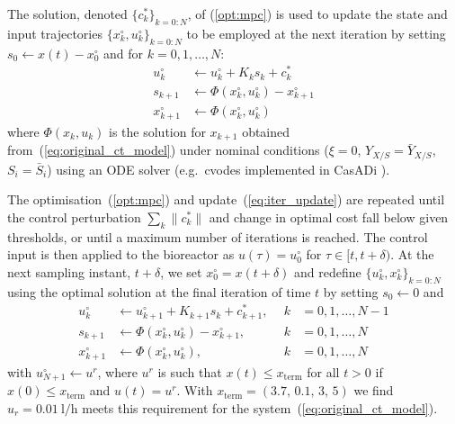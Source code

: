 \documentclass[final,5p,times,twocolumn,authoryear]{elsarticle}
\begin{document}
The solution, denoted $\{c^\ast_k\}_{k=0:N}$, of (\ref{opt:mpc}) is used to update the state and input trajectories $\{x^\circ_k,u^\circ_k\}_{k=0:N}$ to be employed at the next iteration by setting $s_0 \gets x(t) - x_0^\circ$ and for $k=0,1,\ldots,N$:%
\begin{subequations}\label{eq:iter_update}%
\begin{align}
u_k^\circ &\gets u_k^\circ+ K_k s_k  + c_k^\ast 
\\
s_{k+1} & \gets \Phi (x_k^\circ, u_k^\circ) - x_{k+1}^\circ
\\
x_{k+1}^\circ &\gets \Phi (x_k^\circ, u_k^\circ)
\end{align}
\end{subequations}
where $\Phi(x_k,u_k)$ is the solution for $x_{k+1}$ obtained from~(\ref{eq:original_ct_model})  under nominal conditions ($\xi=0$, $Y_{X/S} = \bar{Y}_{X/S}$, $S_i = \bar{S}_i$) using an ODE solver (e.g.~cvodes \citep{hindmarsh05:cvodes} implemented in CasADi \citep{andersson19:casadi}).

The optimisation~(\ref{opt:mpc}) and update~(\ref{eq:iter_update}) are repeated until the control perturbation $\sum_k \|c^\ast_k\|$
and change in optimal cost
fall below given thresholds, or until a maximum number of iterations is reached. The control input is then applied to the bioreactor as
$u(\tau) =u_0^\circ$ for $\tau\in[t,t+\delta)$.
At the next sampling instant, $t+\delta$, we set $x_0^\circ = x(t+\delta)$ and redefine $\{u^\circ_k , x^\circ_k\}_{k=0:N}$ using the optimal solution at the final iteration of time $t$ by setting $s_0 \gets 0$ and%
\begin{subequations}\label{eq:sample_update}%
\begin{alignat}{2}
  u_k^\circ &\gets u_{k+1}^\circ + K_{k+1} s_k + c_{k+1}^\ast , & \ \ k &= 0,1,\ldots,N-1
\\
s_{k+1} & \gets \Phi (x_k^\circ, u_k^\circ) - x_{k+1}^\circ , &\ \ k &= 0,1,\ldots,N
\\
x_{k+1}^\circ &\gets \Phi (x_k^\circ, u_k^\circ) , &\ \ k &= 0,1,\ldots,N
\end{alignat}
\end{subequations}
with $u_{N+1}^\circ \gets u^r$, where $u^r$ is such that $x(t) \leq x_{\mathrm{term}}$ for all $t>0$ if $x(0) \leq x_{\mathrm{term}}$ and $u(t) = u^r$. With $x_{\mathrm{term}} = (3.7,\, 0.1,\, 3,\, 5)$ we find $u_r = \SI{0.01}{\litre\per\hour}$ meets this requirement for the system~(\ref{eq:original_ct_model}).
\end{document}
